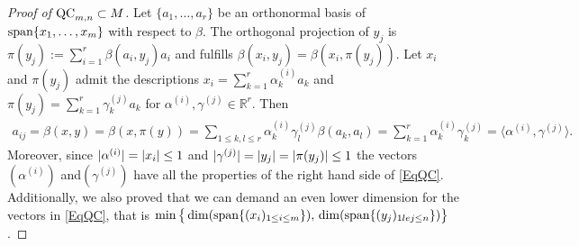 \begin{proof}[Proof of $ \textup{QC}_{m,n} \subset M $]
	Let $ \{a_1,\hdots,a_r\} $ be an orthonormal basis of $ \textup{span} \{ x_1,\hdots,x_m \} $ with respect to $ \beta $. 
	The orthogonal projection of $ y_j $ is $ \pi(y_j):= \sum_{i=1}^{r}\beta(a_i,y_j)a_i $ and fulfills
	$ \beta(x_i,y_j) = \beta(x_i,\pi(y_j)) $. 
	Let $ x_i $ and $ \pi(y_j) $ admit the descriptions 
	$ x_i = \sum_{k=1}^{r}\alpha_k^{(i)}a_k$ and $  \pi(y_j) = \sum_{k=1}^r \gamma_k^{(j)} a_k$ for $ \alpha^{(i)}, \gamma^{(j)} \in \mathbb{R}^r $. Then
	\begin{align*}
	a_{ij}= \beta(x,y)= \beta(x,\pi(y)) = \sum_{1 \le k,l \le r} \alpha_k^{(i)} \gamma_l^{(j)} \beta(a_k,a_l) = \sum_{k=1}^{r}\alpha_k^{(i)}\gamma_k^{(j)} = \langle \alpha^{(i)}, \gamma^{(j)} \rangle.
	\end{align*}
	Moreover, since $ \vert\alpha^{(i)} \vert= {\left|{x_i}\right|} \le 1$ and $\vert \gamma^{(j)}\vert=  {\left|{y_j}\right|}= {\left|{\pi(y_j)}\right|} \le 1 $ the vectors $ (\alpha^{(i)}) $ and$ (\gamma^{(j)}) $ have all the properties of the right hand side of \ref{EqQC}.
	Additionally, we also proved that we can demand an even lower dimension for the vectors in \ref{EqQC}, that is  
	$ \min \big \{ \dim( \textup{span} \{ (x_i)_{1 \le i \le m} \}),\, \dim(\textup{span} \{ (y_j)_{1 le j \le n} \} )\big \} $.
\end{proof}

